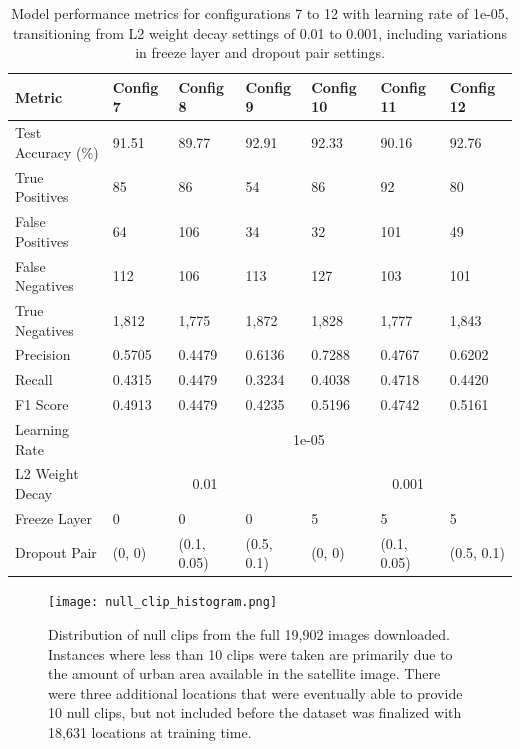 \begin{table}
\centering
\begin{tabular}{|l|l|l|l|l|l|l|}
\hline
Metric & Config 7 & Config 8 & Config 9 & Config 10 & Config 11 & Config 12 \\ \hline
\hline
Test Accuracy (\%) & 91.51 & 89.77 & 92.91 & 92.33 & 90.16 & 92.76 \\ \hline
True Positives & 85 & 86 & 54 & 86 & 92 & 80 \\ \hline
False Positives & 64 & 106 & 34 & 32 & 101 & 49 \\ \hline
False Negatives & 112 & 106 & 113 & 127 & 103 & 101 \\ \hline
True Negatives & 1,812 & 1,775 & 1,872 & 1,828 & 1,777 & 1,843 \\ \hline
\hline
Precision & 0.5705 & 0.4479 & 0.6136 & 0.7288 & 0.4767 & 0.6202 \\ \hline
Recall & 0.4315 & 0.4479 & 0.3234 & 0.4038 & 0.4718 & 0.4420 \\ \hline
F1 Score & 0.4913 & 0.4479 & 0.4235 & 0.5196 & 0.4742 & 0.5161 \\ \hline
\hline
Learning Rate & \multicolumn{6}{c|}{1e-05} \\ \hline
L2 Weight Decay & \multicolumn{3}{c|}{0.01} & \multicolumn{3}{c|}{0.001} \\ \hline
Freeze Layer & 0 & 0 & 0 & 5 & 5 & 5 \\ \hline
Dropout Pair & (0, 0) & (0.1, 0.05) & (0.5, 0.1) & (0, 0) & (0.1, 0.05) & (0.5, 0.1) \\ \hline

\end{tabular}
\caption{Model performance metrics for configurations 7 to 12 with learning rate of 1e-05, transitioning from L2 weight decay settings of 0.01 to 0.001, including variations in freeze layer and dropout pair settings.}
\label{tab:initial_gridsearch_1000B}
\end{table}






\begin{figure}
    \centering
    \texttt{[image: null\_clip\_histogram.png]}
    \caption{Distribution of null clips from the full 19,902 images downloaded.  Instances where less than 10 clips were taken are primarily due to the amount of urban area available in the satellite image.  There were three additional locations that were eventually able to provide 10 null clips, but not included before the dataset was finalized with 18,631 locations at training time.}
    \label{fig:null_hist}
\end{figure}





